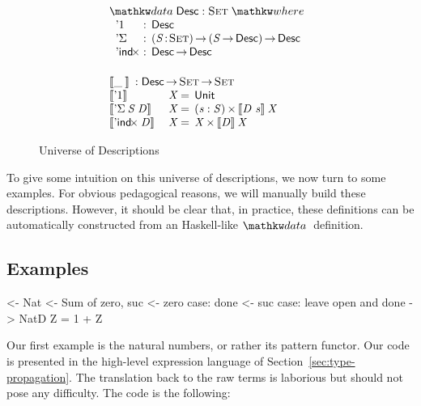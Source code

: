 \begin{figure}

\[\stk{
\begin{array}{ll}
\stk{
\data \Desc : \Set \where \\
\;\;\begin{array}{@{}l@{\::\:\:}l@{\quad}l}
    \DUnit          & \Desc \\
    \DSigma{\!}{\!} & \PI{\V{S}}{\Set} \PIS{\V{S} \To \Desc} \Desc \\
    \DIndx{\!}      & \Desc \To \Desc
\end{array}
}
\vspace{0.2in}
\\
\stk{
\descop{\_\:}{} : \Desc \To \Set \To \Set \\
\begin{array}{@{}ll@{\:=\:\:}ll}
\descop{\DUnit}{& \V{X}}        &  \Unit                                       \\
\descop{\DSigma{\V{S}}{\V{D}}}{& \V{X}} &  \SIGMAS{\V{s} : \V{S}}{\descop{\V{D}~\V{s}}{\V{X}}}         \\
\descop{\DIndx{\V{D}}}{& \V{X}}     &  \TIMES{\V{X}}{\descop{\V{D}}{\V{X}}}
\end{array}
}
\end{array}
}\]


\caption{Universe of Descriptions}
\label{fig:desc_universe}

\end{figure}

To give some intuition on this universe of descriptions, we now turn
to some examples. For obvious pedagogical reasons, we will manually
build these descriptions. However, it should be clear that, in
practice, these definitions can be automatically constructed from an
Haskell-like $\data$ definition.

\subsection{Examples}
\label{sec:desc-examples}

\begin{wstructure}
<- Nat
    <- Sum of zero, suc
    <- zero case: done
    <- suc case: leave open and done
    -> NatD Z = 1 + Z
\end{wstructure}

Our first example is the natural numbers, or rather its pattern
functor. Our code is presented in the high-level expression language
of Section~\ref{sec:type-propagation}. The translation back to the raw
terms is laborious but should not pose any difficulty. The code is the
following:

